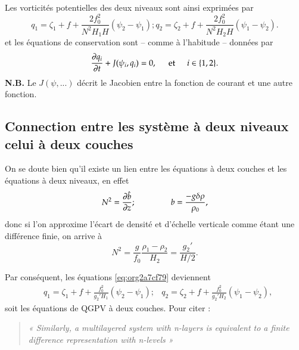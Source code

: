 \documentclass[10pt]{article}
\numberwithin{equation}{section}
\begin{document}
Les vorticités potentielles des deux niveaux sont ainsi exprimées par
\begin{subequations}
\label{eq:org2a7cf79}
\begin{equation}
q_1 = \zeta_1 + f + \frac{2 f_0^2}{N^2 H_1 H} (\psi_2 - \psi_1);
\end{equation}
\begin{equation}
q_2 = \zeta_2 + f + \frac{2 f_0^2}{N^2 H_2 H} (\psi_1 - \psi_2).
\end{equation}
\end{subequations}
et les équations de conservation sont -- comme à l'habitude -- données par
\begin{equation}
\pdv{q_i}{t} + J (\psi_i,q_i) = 0,
\hspace{0.5cm} \text{et} \hspace{0.5cm}
i \in \qty{1,2}.
\end{equation}
\textbf{N.B.} Le \(J(\psi,...)\) décrit le Jacobien entre la fonction de courant et une autre fonction.
\vspace{2cm}

\subsection{Connection entre les système à \textbf{deux niveaux} celui à \textbf{deux couches}}
\label{sec:org2ee0e7b}
On se doute bien qu'il existe un lien entre les équations à deux couches et les équations à deux niveaux, en effet
\begin{equation}  
N^2 = \pdv{\hat{b}}{z}; \hspace{1.5cm} b = \frac{-g\delta \rho}{\rho_0},
\end{equation}
donc si l'on approxime l'écart de densité et d'échelle verticale comme étant une différence finie, on arrive à
\begin{equation}
N^2 = \frac{g}{f_0} \frac{\rho_1 - \rho_2}{H_2} = \frac{g_2'}{H/2}.
\end{equation}

Par conséquent, les équations \ref{eq:org2a7cf79} deviennent
\begin{align}
&q_1 = \zeta_1 + f + \frac{f_0^2}{g_2' H_1} (\psi_2 - \psi_1);
&q_2 = \zeta_2 + f + \frac{f_0^2}{g_2' H_2} (\psi_1 - \psi_2),
\end{align}
soit les équations de QGPV à deux couches.
Pour citer \citep[p.195]{vallis_2006} :
\begin{quote}
\textit{« Similarly, a multilayered system with n-layers is equivalent to a finite difference representation with n-levels »}
\end{quote}
\end{document}
